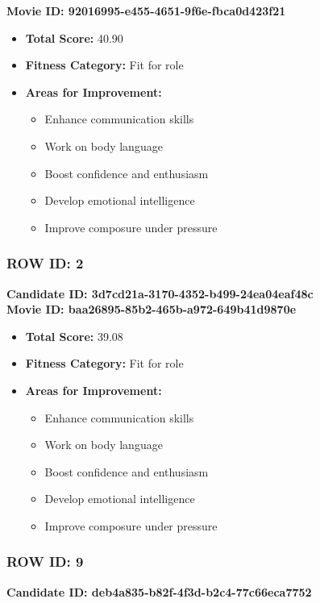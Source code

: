 \documentclass{article}
\begin{document}
\textbf{Movie ID: 92016995-e455-4651-9f6e-fbca0d423f21}
\begin{itemize}
    \item \textbf{Total Score:} 40.90
    \item \textbf{Fitness Category:} Fit for role
    \item \textbf{Areas for Improvement:}
    \begin{itemize}
        \item Enhance communication skills
        \item Work on body language
        \item Boost confidence and enthusiasm
        \item Develop emotional intelligence
        \item Improve composure under pressure
    \end{itemize}
\end{itemize}

\subsubsection{ROW ID: 2 }
\textbf{Candidate ID: 3d7cd21a-3170-4352-b499-24ea04eaf48c}\\

\textbf{Movie ID: baa26895-85b2-465b-a972-649b41d9870e}
\begin{itemize}
    \item \textbf{Total Score:} 39.08
    \item \textbf{Fitness Category:} Fit for role
    \item \textbf{Areas for Improvement:}
    \begin{itemize}
        \item Enhance communication skills
        \item Work on body language
        \item Boost confidence and enthusiasm
        \item Develop emotional intelligence
        \item Improve composure under pressure
    \end{itemize}
\end{itemize}

\subsubsection{ROW ID: 9 }
\textbf{Candidate ID: deb4a835-b82f-4f3d-b2c4-77c66eca7752}\\
\end{document}
